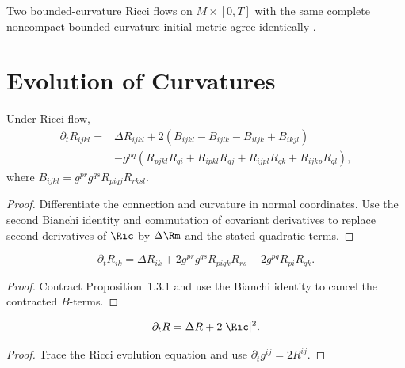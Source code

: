 \begin{theorem}
  \label{thm:cz-bounded-curvature-uniqueness-on-complete-noncompact-manifolds}
Two bounded-curvature Ricci flows on $M\times[0,T]$ with the same
complete noncompact bounded-curvature initial metric agree identically
\cite{CZ05U}.
\end{theorem}

\section{Evolution of Curvatures}

\begin{proposition}
  \label{prop:cz-evolution-of-the-riemann-curvature-tensor}
Under Ricci flow,
\begin{align*}
\partial_tR_{ijkl}={}&\Delta R_{ijkl}
+2(B_{ijkl}-B_{ijlk}-B_{iljk}+B_{ikjl})\\
&-g^{pq}(R_{pjkl}R_{qi}+R_{ipkl}R_{qj}+R_{ijpl}R_{qk}+R_{ijkp}R_{ql}),
\end{align*}
where $B_{ijkl}=g^{pr}g^{qs}R_{piqj}R_{rksl}$.
\cite{Ha82}
\end{proposition}
\begin{proof}
\sketch Differentiate the connection and curvature in normal
coordinates.  Use the second Bianchi identity and commutation of
covariant derivatives to replace second derivatives of $\Ric$ by
$\Delta\Rm$ and the stated quadratic terms.
\end{proof}

\begin{corollary}
  \label{cor:cz-evolution-of-the-ricci-tensor}
\[
\partial_tR_{ik}=\Delta R_{ik}+2g^{pr}g^{qs}R_{piqk}R_{rs}
-2g^{pq}R_{pi}R_{qk}.
\]
\end{corollary}
\begin{proof}
\sketch Contract Proposition~1.3.1 and use the Bianchi identity to
cancel the contracted $B$-terms.
\end{proof}

\begin{corollary}
  \label{cor:cz-evolution-of-scalar-curvature}
\[
\partial_tR=\Delta R+2|\Ric|^2.
\]
\end{corollary}
\begin{proof}
\sketch Trace the Ricci evolution equation and use
$\partial_tg^{ij}=2R^{ij}$.
\end{proof}

